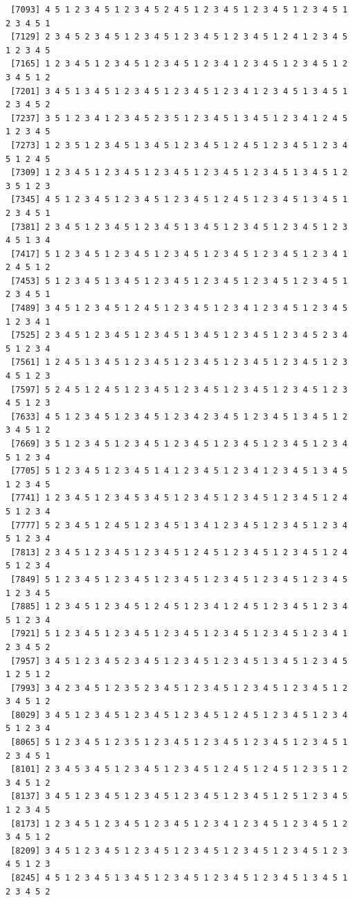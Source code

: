\documentclass[
  11pt,
]{book}
\begin{document}
\begin{verbatim}
 [7093] 4 5 1 2 3 4 5 1 2 3 4 5 2 4 5 1 2 3 4 5 1 2 3 4 5 1 2 3 4 5 1 2 3 4 5 1
 [7129] 2 3 4 5 2 3 4 5 1 2 3 4 5 1 2 3 4 5 1 2 3 4 5 1 2 4 1 2 3 4 5 1 2 3 4 5
 [7165] 1 2 3 4 5 1 2 3 4 5 1 2 3 4 5 1 2 3 4 1 2 3 4 5 1 2 3 4 5 1 2 3 4 5 1 2
 [7201] 3 4 5 1 3 4 5 1 2 3 4 5 1 2 3 4 5 1 2 3 4 1 2 3 4 5 1 3 4 5 1 2 3 4 5 2
 [7237] 3 5 1 2 3 4 1 2 3 4 5 2 3 5 1 2 3 4 5 1 3 4 5 1 2 3 4 1 2 4 5 1 2 3 4 5
 [7273] 1 2 3 5 1 2 3 4 5 1 3 4 5 1 2 3 4 5 1 2 4 5 1 2 3 4 5 1 2 3 4 5 1 2 4 5
 [7309] 1 2 3 4 5 1 2 3 4 5 1 2 3 4 5 1 2 3 4 5 1 2 3 4 5 1 3 4 5 1 2 3 5 1 2 3
 [7345] 4 5 1 2 3 4 5 1 2 3 4 5 1 2 3 4 5 1 2 4 5 1 2 3 4 5 1 3 4 5 1 2 3 4 5 1
 [7381] 2 3 4 5 1 2 3 4 5 1 2 3 4 5 1 3 4 5 1 2 3 4 5 1 2 3 4 5 1 2 3 4 5 1 3 4
 [7417] 5 1 2 3 4 5 1 2 3 4 5 1 2 3 4 5 1 2 3 4 5 1 2 3 4 5 1 2 3 4 1 2 4 5 1 2
 [7453] 5 1 2 3 4 5 1 3 4 5 1 2 3 4 5 1 2 3 4 5 1 2 3 4 5 1 2 3 4 5 1 2 3 4 5 1
 [7489] 3 4 5 1 2 3 4 5 1 2 4 5 1 2 3 4 5 1 2 3 4 1 2 3 4 5 1 2 3 4 5 1 2 3 4 1
 [7525] 2 3 4 5 1 2 3 4 5 1 2 3 4 5 1 3 4 5 1 2 3 4 5 1 2 3 4 5 2 3 4 5 1 2 3 4
 [7561] 1 2 4 5 1 3 4 5 1 2 3 4 5 1 2 3 4 5 1 2 3 4 5 1 2 3 4 5 1 2 3 4 5 1 2 3
 [7597] 5 2 4 5 1 2 4 5 1 2 3 4 5 1 2 3 4 5 1 2 3 4 5 1 2 3 4 5 1 2 3 4 5 1 2 3
 [7633] 4 5 1 2 3 4 5 1 2 3 4 5 1 2 3 4 2 3 4 5 1 2 3 4 5 1 3 4 5 1 2 3 4 5 1 2
 [7669] 3 5 1 2 3 4 5 1 2 3 4 5 1 2 3 4 5 1 2 3 4 5 1 2 3 4 5 1 2 3 4 5 1 2 3 4
 [7705] 5 1 2 3 4 5 1 2 3 4 5 1 4 1 2 3 4 5 1 2 3 4 1 2 3 4 5 1 3 4 5 1 2 3 4 5
 [7741] 1 2 3 4 5 1 2 3 4 5 3 4 5 1 2 3 4 5 1 2 3 4 5 1 2 3 4 5 1 2 4 5 1 2 3 4
 [7777] 5 2 3 4 5 1 2 4 5 1 2 3 4 5 1 3 4 1 2 3 4 5 1 2 3 4 5 1 2 3 4 5 1 2 3 4
 [7813] 2 3 4 5 1 2 3 4 5 1 2 3 4 5 1 2 4 5 1 2 3 4 5 1 2 3 4 5 1 2 4 5 1 2 3 4
 [7849] 5 1 2 3 4 5 1 2 3 4 5 1 2 3 4 5 1 2 3 4 5 1 2 3 4 5 1 2 3 4 5 1 2 3 4 5
 [7885] 1 2 3 4 5 1 2 3 4 5 1 2 4 5 1 2 3 4 1 2 4 5 1 2 3 4 5 1 2 3 4 5 1 2 3 4
 [7921] 5 1 2 3 4 5 1 2 3 4 5 1 2 3 4 5 1 2 3 4 5 1 2 3 4 5 1 2 3 4 1 2 3 4 5 2
 [7957] 3 4 5 1 2 3 4 5 2 3 4 5 1 2 3 4 5 1 2 3 4 5 1 3 4 5 1 2 3 4 5 1 2 5 1 2
 [7993] 3 4 2 3 4 5 1 2 3 5 2 3 4 5 1 2 3 4 5 1 2 3 4 5 1 2 3 4 5 1 2 3 4 5 1 2
 [8029] 3 4 5 1 2 3 4 5 1 2 3 4 5 1 2 3 4 5 1 2 4 5 1 2 3 4 5 1 2 3 4 5 1 2 3 4
 [8065] 5 1 2 3 4 5 1 2 3 5 1 2 3 4 5 1 2 3 4 5 1 2 3 4 5 1 2 3 4 5 1 2 3 4 5 1
 [8101] 2 3 4 5 3 4 5 1 2 3 4 5 1 2 3 4 5 1 2 4 5 1 2 4 5 1 2 3 5 1 2 3 4 5 1 2
 [8137] 3 4 5 1 2 3 4 5 1 2 3 4 5 1 2 3 4 5 1 2 3 4 5 1 2 5 1 2 3 4 5 1 2 3 4 5
 [8173] 1 2 3 4 5 1 2 3 4 5 1 2 3 4 5 1 2 3 4 1 2 3 4 5 1 2 3 4 5 1 2 3 4 5 1 2
 [8209] 3 4 5 1 2 3 4 5 1 2 3 4 5 1 2 3 4 5 1 2 3 4 5 1 2 3 4 5 1 2 3 4 5 1 2 3
 [8245] 4 5 1 2 3 4 5 1 3 4 5 1 2 3 4 5 1 2 3 4 5 1 2 3 4 5 1 3 4 5 1 2 3 4 5 2

\end{verbatim}
\end{document}
